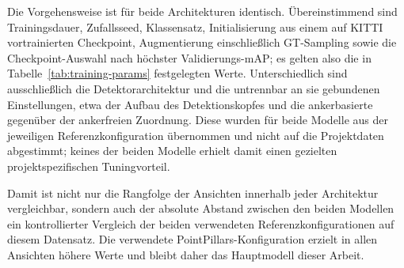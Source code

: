 Die Vorgehensweise ist für beide Architekturen identisch. Übereinstimmend sind Trainingsdauer, Zufallsseed, Klassensatz, Initialisierung aus einem auf KITTI vortrainierten Checkpoint, Augmentierung einschließlich GT-Sampling sowie die Checkpoint-Auswahl nach höchster Validierungs-mAP; es gelten also die in Tabelle~\ref{tab:training-params} festgelegten Werte. Unterschiedlich sind ausschließlich die Detektorarchitektur und die untrennbar an sie gebundenen Einstellungen, etwa der Aufbau des Detektionskopfes und die ankerbasierte gegenüber der ankerfreien Zuordnung. Diese wurden für beide Modelle aus der jeweiligen Referenzkonfiguration übernommen und nicht auf die Projektdaten abgestimmt; keines der beiden Modelle erhielt damit einen gezielten projektspezifischen Tuningvorteil.

Damit ist nicht nur die Rangfolge der Ansichten innerhalb jeder Architektur vergleichbar, sondern auch der absolute Abstand zwischen den beiden Modellen ein kontrollierter Vergleich der beiden verwendeten Referenzkonfigurationen auf diesem Datensatz. Die verwendete PointPillars-Konfiguration erzielt in allen Ansichten höhere Werte und bleibt daher das Hauptmodell dieser Arbeit.
